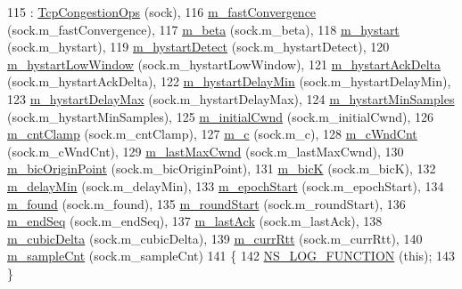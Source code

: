 \begin{DoxyCode}
115   : \hyperlink{classns3_1_1TcpCongestionOps_a044982d009b94a2bbf59ed27cdb14e91}{TcpCongestionOps} (sock),
116     \hyperlink{classns3_1_1TcpCubic_a90051598ce6276440db0c3b5c0118ebf}{m\_fastConvergence} (sock.m\_fastConvergence),
117     \hyperlink{classns3_1_1TcpCubic_a71879d000e1dcba749c4fae90c8e873d}{m\_beta} (sock.m\_beta),
118     \hyperlink{classns3_1_1TcpCubic_a2df1ddb29a2f2a8e1f1886665a92f687}{m\_hystart} (sock.m\_hystart),
119     \hyperlink{classns3_1_1TcpCubic_a34e8c17f1c5c470fa39aa77d6d1bbda5}{m\_hystartDetect} (sock.m\_hystartDetect),
120     \hyperlink{classns3_1_1TcpCubic_af23b1714553886c496927ba6d75269b4}{m\_hystartLowWindow} (sock.m\_hystartLowWindow),
121     \hyperlink{classns3_1_1TcpCubic_a8aa5da315009dabca1e8136de5e65015}{m\_hystartAckDelta} (sock.m\_hystartAckDelta),
122     \hyperlink{classns3_1_1TcpCubic_a63dffc9a29dc6577a99c4046efcb01f0}{m\_hystartDelayMin} (sock.m\_hystartDelayMin),
123     \hyperlink{classns3_1_1TcpCubic_a1003aa1c760f12195ea62f0e86dbcfb4}{m\_hystartDelayMax} (sock.m\_hystartDelayMax),
124     \hyperlink{classns3_1_1TcpCubic_ae86cb481bd166effae7227e90e9bafbb}{m\_hystartMinSamples} (sock.m\_hystartMinSamples),
125     \hyperlink{classns3_1_1TcpCubic_adfc5ffb73bcdeb85814048a2adf01c1e}{m\_initialCwnd} (sock.m\_initialCwnd),
126     \hyperlink{classns3_1_1TcpCubic_aafd8945276979821c592ac578746a708}{m\_cntClamp} (sock.m\_cntClamp),
127     \hyperlink{classns3_1_1TcpCubic_acb9bb68447f9a9e0eb0cb1f95eb7aca7}{m\_c} (sock.m\_c),
128     \hyperlink{classns3_1_1TcpCubic_a56b424a0e9790d9ef8b2b2ea6b399d49}{m\_cWndCnt} (sock.m\_cWndCnt),
129     \hyperlink{classns3_1_1TcpCubic_adce8ab449a7a20e606b9021c4460b956}{m\_lastMaxCwnd} (sock.m\_lastMaxCwnd),
130     \hyperlink{classns3_1_1TcpCubic_a10fb71cdb4155d6e61174690e6bc295a}{m\_bicOriginPoint} (sock.m\_bicOriginPoint),
131     \hyperlink{classns3_1_1TcpCubic_a2eb43ad263dbf87c343bbdaeea7eefc7}{m\_bicK} (sock.m\_bicK),
132     \hyperlink{classns3_1_1TcpCubic_a97143c4377ca57cac3095206a85e8db0}{m\_delayMin} (sock.m\_delayMin),
133     \hyperlink{classns3_1_1TcpCubic_aa93581f58a0b6e113d533eda3f86b9a7}{m\_epochStart} (sock.m\_epochStart),
134     \hyperlink{classns3_1_1TcpCubic_a63fac9018c36941b4bbc5d5f20f21abf}{m\_found} (sock.m\_found),
135     \hyperlink{classns3_1_1TcpCubic_a9c55defdbfe7bb3e12c6dedaece70434}{m\_roundStart} (sock.m\_roundStart),
136     \hyperlink{classns3_1_1TcpCubic_a68e4f286739c0436737028bda53f1a48}{m\_endSeq} (sock.m\_endSeq),
137     \hyperlink{classns3_1_1TcpCubic_a735cbf51912a83d6c1a75d07879ce69e}{m\_lastAck} (sock.m\_lastAck),
138     \hyperlink{classns3_1_1TcpCubic_a10b3b2aedb75eb85ecf5e339462def08}{m\_cubicDelta} (sock.m\_cubicDelta),
139     \hyperlink{classns3_1_1TcpCubic_a0082d2bc456e29345d611b313091bbab}{m\_currRtt} (sock.m\_currRtt),
140     \hyperlink{classns3_1_1TcpCubic_a189a416124fb57d08f10b40bbdb43394}{m\_sampleCnt} (sock.m\_sampleCnt)
141 \{
142   \hyperlink{log-macros-disabled_8h_a90b90d5bad1f39cb1b64923ea94c0761}{NS\_LOG\_FUNCTION} (\textcolor{keyword}{this});
143 \}
\end{DoxyCode}


